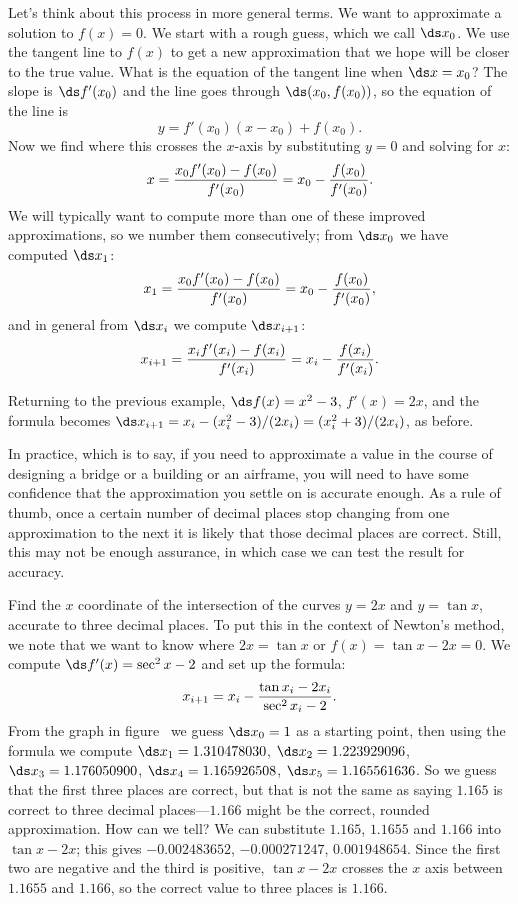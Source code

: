 Let's think about this process in more general terms. We want to
approximate a solution to $f(x)=0$.
We start with a rough guess, which we call $\ds x_0$.  We use the tangent
line to $f(x)$ to get a new approximation that we hope will be closer
to the true value. What is the equation of the tangent line when
$\ds x=x_0$? The slope is $\ds f'(x_0)$ and the line goes through
$\ds(x_0,f(x_0))$, so the equation of the line is
$$ y=f'(x_0)(x-x_0)+f(x_0).$$
Now we find where this crosses the $x$-axis by substituting $y=0$ and
solving for $x$:
$$x={x_0f'(x_0)-f(x_0)\over f'(x_0)} = x_0 - {f(x_0)\over f'(x_0)}.$$
We will typically want to compute more than one of these improved
approximations, so we number them consecutively; from $\ds x_0$ we have
computed $\ds x_1$:
$$x_1={x_0f'(x_0)-f(x_0)\over f'(x_0)} = x_0 - {f(x_0)\over f'(x_0)},$$
and in general from $\ds x_i$ we compute $\ds x_{i+1}$:
$$x_{i+1}={x_if'(x_i)-f(x_i)\over f'(x_i)} = x_i - {f(x_i)\over f'(x_i)}.$$

\begin{example}
Returning to the previous example, $\ds f(x)=x^2-3$, $f'(x)=2x$, and the
formula becomes $\ds x_{i+1}=x_i - (x_i^2-3)/(2x_i)=(x_i^2+3)/(2x_i)$, as
before.
\end{example}

In practice, which is to say, if you need to approximate a value in
the course of designing a bridge or a building or an airframe, you
will need to have some confidence that the approximation you settle on
is accurate enough. As a rule of thumb, once a certain number of
decimal places stop changing from one approximation to the next it is
likely that those decimal places are correct. Still, this may not be
enough assurance, in which case we can test the result for accuracy.

\begin{example} Find the $x$ coordinate of the intersection of the curves $y=2x$
and $y=\tan x$, accurate to three decimal places. To put this in the
context of Newton's method, we note that we want to know where $2x=\tan
x$ or $f(x)=\tan x-2x=0$. We compute $\ds f'(x)=\sec^2 x - 2$ and set up the
formula:
$$x_{i+1} = x_i-{\tan x_i -2x_i\over \sec^2 x_i - 2}.$$ From the graph
in figure~ 
we guess $\ds x_0=1$ as a starting point, then using the formula we
compute $\ds x_1=1.310478030$, $\ds x_2=1.223929096$, $\ds x_3=1.176050900$,
$\ds x_4=1.165926508$, $\ds x_5=1.165561636$.  So we guess that the first
three places are correct, but that is not the same as saying $1.165$
is correct to three decimal places---$1.166$ might be the correct,
rounded approximation. How can we tell? We can substitute $1.165$,
$1.1655$ and $1.166$ into $\tan x - 2x$; this
gives $-0.002483652$, $-0.000271247$, $0.001948654$. Since the first
two are negative and the third is positive, $\tan x - 2x$ crosses the
$x$ axis between $1.1655$ and $1.166$, so the correct value to three
places is $1.166$.
\end{example}

